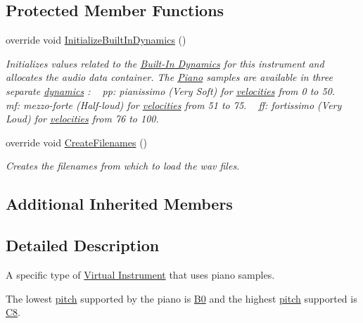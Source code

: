 \subsection*{Protected Member Functions}
\begin{DoxyCompactItemize}
\item 
override void \hyperlink{group___piano_virt_func_ga6bc02528f8808b8a30aa7d5776445a6d}{Initialize\+Built\+In\+Dynamics} ()
\begin{DoxyCompactList}\small\item\em Initializes values related to the \hyperlink{group___audio_DefBID}{Built-\/\+In Dynamics} for this instrument and allocates the audio data container. The \hyperlink{class_piano}{Piano} samples are available in three separate \hyperlink{group___audio_DefBID}{dynamics} \+: ~\newline
 pp\+: pianissimo (Very Soft) for \hyperlink{group___audio_DefVel}{velocities} from 0 to 50. ~\newline
 mf\+: mezzo-\/forte (Half-\/loud) for \hyperlink{group___audio_DefVel}{velocities} from 51 to 75. ~\newline
 ff\+: fortissimo (Very Loud) for \hyperlink{group___audio_DefVel}{velocities} from 76 to 100. \end{DoxyCompactList}\item 
override void \hyperlink{group___piano_virt_func_gaafd50f0f04ea7ea4f560accc628b8f1b}{Create\+Filenames} ()
\begin{DoxyCompactList}\small\item\em Creates the filenames from which to load the wav files. \end{DoxyCompactList}\end{DoxyCompactItemize}
\subsection*{Additional Inherited Members}


\subsection{Detailed Description}
A specific type of \hyperlink{group___v_i}{Virtual Instrument} that uses piano samples. 

The lowest \hyperlink{group___music_enums_ga508f69b199ea518f935486c990edac1d}{pitch} supported by the piano is \hyperlink{group___music_enums_ga508f69b199ea518f935486c990edac1d}{B0} and the highest \hyperlink{group___music_enums_ga508f69b199ea518f935486c990edac1d}{pitch} supported is \hyperlink{group___music_enums_ga508f69b199ea518f935486c990edac1d}{C8}.

